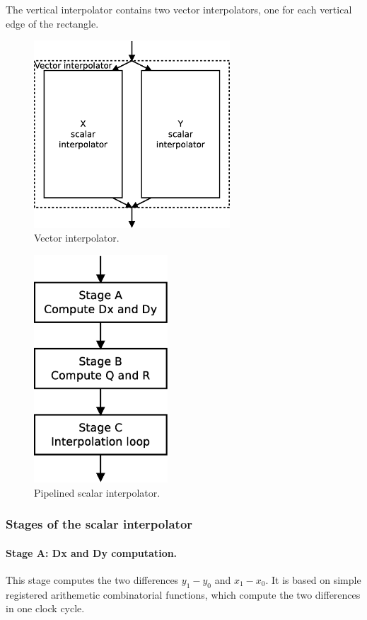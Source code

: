 \documentclass[a4paper,11pt]{kthesis}
\begin{document}
The vertical interpolator contains two vector interpolators, one for each vertical edge of the rectangle.

\begin{figure}[htp]
\centering
\includegraphics[height=70mm]{vectinter.eps}
\caption{Vector interpolator.}
\label{fig:vectinter}
\end{figure}

\begin{figure}[htp]
\centering
\includegraphics[height=85mm]{pipeinter.eps}
\caption{Pipelined scalar interpolator.}
\label{fig:pipeinter}
\end{figure}

\subsubsection{Stages of the scalar interpolator}
\paragraph{Stage A: Dx and Dy computation.} This stage computes the two differences $y_{1} - y_{0}$ and $x_{1} - x_{0}$. It is based on simple registered arithemetic combinatorial functions, which compute the two differences in one clock cycle.
\end{document}
